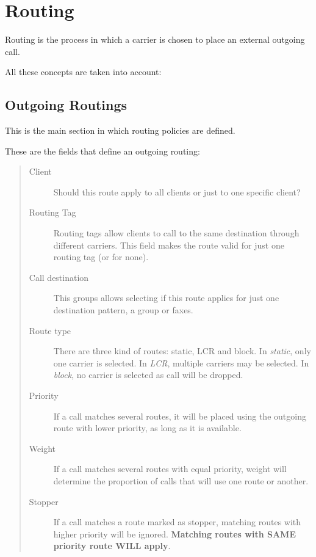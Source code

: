 \documentclass[letterpaper,10pt,spanish]{sphinxmanual}
\begin{document}
\section{Routing}
\label{administration_portal/brand/routing/index::doc}\label{administration_portal/brand/routing/index:routing}
Routing is the process in which a carrier is chosen to place an external outgoing call.

All these concepts are taken into account:
\label{administration_portal/brand/routing/outgoing_routings:routes-weights}

\subsection{Outgoing Routings}
\label{administration_portal/brand/routing/outgoing_routings:routes-weights}\label{administration_portal/brand/routing/outgoing_routings:id1}\label{administration_portal/brand/routing/outgoing_routings::doc}\label{administration_portal/brand/routing/outgoing_routings:outgoing-routings}
This is the main section in which routing policies are defined.

These are the fields that define an outgoing routing:
\begin{quote}
\begin{description}
\item[{Client}] \leavevmode
Should this route apply to all clients or just to one specific client?

\item[{Routing Tag}] \leavevmode
Routing tags allow clients to call to the same destination through different carriers. This field makes the
route valid for just one routing tag (or for none).

\item[{Call destination}] \leavevmode
This groups allows selecting if this route applies for just one destination pattern, a group or faxes.

\item[{Route type}] \leavevmode
There are three kind of routes: static, LCR and block. In \emph{static}, only one carrier is selected. In \emph{LCR}, multiple carriers
may be selected. In \emph{block}, no carrier is selected as call will be dropped.

\item[{Priority}] \leavevmode
If a call matches several routes, it will be placed using the outgoing
route with lower priority, as long as it is available.

\item[{Weight}] \leavevmode
If a call matches several routes with equal priority, weight will determine
the proportion of calls that will use one route or another.

\item[{Stopper}] \leavevmode
If a call matches a route marked as stopper, matching routes with higher priority
will be ignored. \textbf{Matching routes with SAME priority route WILL apply}.

\end{description}
\end{quote}
\end{document}
